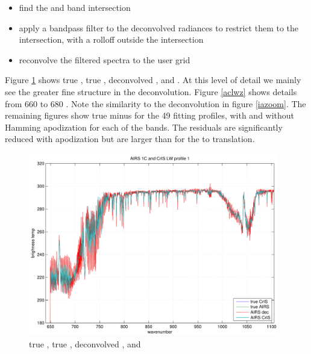 \documentclass[12pt]{article}
\begin{document}
\begin{itemize}
  \item find the {\airs} and {\cris} band intersection

  \item apply a bandpass filter to the deconvolved {\airs} radiances
    to restrict them to the intersection, with a rolloff outside the
    intersection

  \item reconvolve the filtered spectra to the {\cris} user grid

\end{itemize}

Figure \ref{aclws} shows true {\cris}, true {\airs}, deconvolved
{\airs}, and {\airs} {\cris}.  At this level of detail we mainly see
the greater fine structure in the deconvolution.  Figure \ref{aclwz}
shows details from 660 to 680 {\wn}.  Note the similarity to the
{\iasi} deconvolution in figure \ref{iazoom}.  The remaining figures
show true {\cris} minus {\airs} {\cris} for the 49 fitting profiles,
with and without Hamming apodization for each of the {\cris} bands.
The residuals are significantly reduced with apodization but are
larger than for the {\iasi} to {\cris} translation.

\begin{figure}
  \centering
  \includegraphics[height=8cm]{figures/airs_cris_spec_LW_noap.pdf}
  \caption{true {\cris}, true {\airs}, deconvolved {\airs}, and
    {\airs} {\cris} }
  \label{aclws}
\end{figure}
\end{document}
